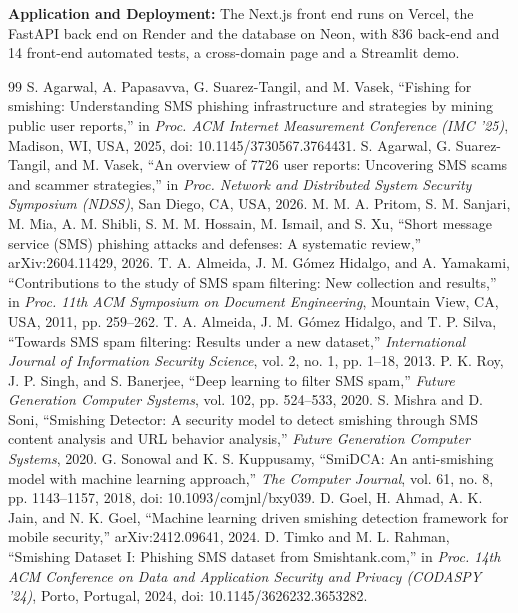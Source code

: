 \textbf{Application and Deployment:} The Next.js front end runs on Vercel, the FastAPI back end on Render and the database on Neon, with 836 back-end and 14 front-end automated tests, a cross-domain page and a Streamlit demo.
\clearpage
\renewcommand{\bibname}{References}
\begin{thebibliography}{99}\small
{} S. Agarwal, A. Papasavva, G. Suarez-Tangil, and M. Vasek, ``Fishing for smishing: Understanding SMS phishing infrastructure and strategies by mining public user reports,'' in \textit{Proc. ACM Internet Measurement Conference (IMC '25)}, Madison, WI, USA, 2025, doi: 10.1145/3730567.3764431.
 S. Agarwal, G. Suarez-Tangil, and M. Vasek, ``An overview of 7726 user reports: Uncovering SMS scams and scammer strategies,'' in \textit{Proc. Network and Distributed System Security Symposium (NDSS)}, San Diego, CA, USA, 2026.
 M. M. A. Pritom, S. M. Sanjari, M. Mia, A. M. Shibli, S. M. M. Hossain, M. Ismail, and S. Xu, ``Short message service (SMS) phishing attacks and defenses: A systematic review,'' arXiv:2604.11429, 2026.
 T. A. Almeida, J. M. G\'omez Hidalgo, and A. Yamakami, ``Contributions to the study of SMS spam filtering: New collection and results,'' in \textit{Proc. 11th ACM Symposium on Document Engineering}, Mountain View, CA, USA, 2011, pp. 259--262.
 T. A. Almeida, J. M. G\'omez Hidalgo, and T. P. Silva, ``Towards SMS spam filtering: Results under a new dataset,'' \textit{International Journal of Information Security Science}, vol. 2, no. 1, pp. 1--18, 2013.
 P. K. Roy, J. P. Singh, and S. Banerjee, ``Deep learning to filter SMS spam,'' \textit{Future Generation Computer Systems}, vol. 102, pp. 524--533, 2020.
 S. Mishra and D. Soni, ``Smishing Detector: A security model to detect smishing through SMS content analysis and URL behavior analysis,'' \textit{Future Generation Computer Systems}, 2020.
 G. Sonowal and K. S. Kuppusamy, ``SmiDCA: An anti-smishing model with machine learning approach,'' \textit{The Computer Journal}, vol. 61, no. 8, pp. 1143--1157, 2018, doi: 10.1093/comjnl/bxy039.
 D. Goel, H. Ahmad, A. K. Jain, and N. K. Goel, ``Machine learning driven smishing detection framework for mobile security,'' arXiv:2412.09641, 2024.
 D. Timko and M. L. Rahman, ``Smishing Dataset I: Phishing SMS dataset from Smishtank.com,'' in \textit{Proc. 14th ACM Conference on Data and Application Security and Privacy (CODASPY '24)}, Porto, Portugal, 2024, doi: 10.1145/3626232.3653282.

\end{thebibliography}
